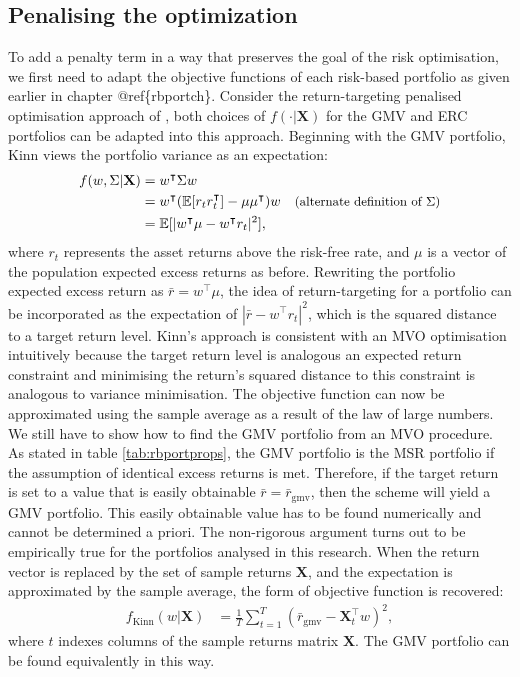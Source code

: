 \documentclass[
]{article}
\begin{document}
\hypertarget{penalising-the-optimization}{%
\subsection{Penalising the optimization}\label{penalising-the-optimization}}

To add a penalty term in a way that preserves the goal of the risk optimisation, we first need to
adapt the objective functions of each risk-based portfolio as given earlier in chapter
@ref\{rbportch\}. Consider the return-targeting penalised optimisation approach of \citet{K18}, both choices
of \(f(\cdot|\textbf{X})\) for the GMV and ERC portfolios can be adapted into this approach. Beginning
with the GMV portfolio, Kinn views the portfolio variance as an expectation:
\begin{align*}
f(w, \Sigma  | \textbf{X}) &= w^\intercal \Sigma w &\\
& = w^\intercal (\mathbb{E}[{r}_t {r}_t^\intercal] - \mu \mu^\intercal) w & \small\text{(alternate definition of $\Sigma$)} \\
& = \mathbb{E}[|w^\intercal \mu - w^\intercal {r}_t|^2],
\end{align*}
where \({r}_t\) represents the asset returns above the risk-free rate, and \(\mu\) is a vector of the
population expected excess returns as before. Rewriting the portfolio expected excess return as
\(\bar{r} = w^\intercal \mu\), the idea of return-targeting for a portfolio can be incorporated as the
expectation of \(|\bar{r} - w^\intercal {r}_t|^2\), which is the squared distance to a target return
level. Kinn's approach is consistent with an MVO optimisation intuitively because the target return
level is analogous an expected return constraint and minimising the return's squared distance to this
constraint is analogous to variance minimisation. The objective function can now be approximated using
the sample average as a result of the law of large numbers. We still have to show how to find the GMV
portfolio from an MVO procedure. As stated in table \ref{tab:rbportprops}, the GMV portfolio is the
MSR portfolio if the assumption of identical excess returns is met. Therefore, if the target return is
set to a value that is easily obtainable \(\bar{r} = \bar{r}_\mathrm{gmv}\), then the scheme will yield
a GMV portfolio. This easily obtainable value has to be found numerically and cannot be determined a
priori. The non-rigorous argument turns out to be empirically true for the portfolios analysed in this
research. When the return vector is replaced by the set of sample returns \(\textbf{X}\), and the
expectation is approximated by the sample average, the \citet{K18} form of objective function is recovered:
\begin{align}
f_{\text{Kinn}}(w|\textbf{X}) &= \frac{1}{T} \sum_{t = 1}^T  (\bar{r}_\mathrm{gmv} - \textbf{X}^\intercal_t w)^2, \label{eq:kinnop1}
\end{align}
where \(t\) indexes columns of the sample returns matrix \(\textbf{X}\). The GMV portfolio can be found equivalently in this way.
\end{document}
